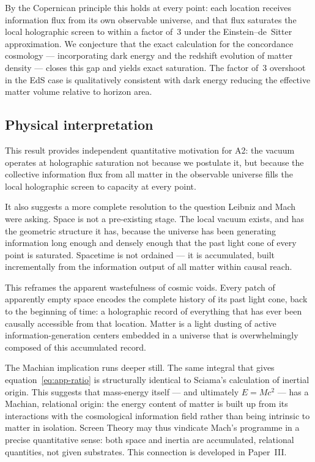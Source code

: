 \documentclass[12pt]{article}
\begin{document}
By the Copernican principle this holds at every point: each location
receives information flux from its own observable universe, and that
flux saturates the local holographic screen to within a factor of~3
under the Einstein--de~Sitter approximation.
We conjecture that the exact calculation for the concordance cosmology
--- incorporating dark energy and the redshift evolution of matter
density --- closes this gap and yields exact saturation.
The factor of~3 overshoot in the EdS case is qualitatively consistent
with dark energy reducing the effective matter volume relative to
horizon area.

\subsection*{Physical interpretation}

This result provides independent quantitative motivation for A2:
the vacuum operates at holographic saturation not because we
postulate it, but because the collective information flux from all
matter in the observable universe fills the local holographic screen
to capacity at every point.

It also suggests a more complete resolution to the question Leibniz
and Mach were asking.
Space is not a pre-existing stage.
The local vacuum exists, and has the geometric structure it has,
because the universe has been generating information long enough and
densely enough that the past light cone of every point is saturated.
Spacetime is not ordained --- it is accumulated, built incrementally
from the information output of all matter within causal reach.

This reframes the apparent wastefulness of cosmic voids.
Every patch of apparently empty space encodes the complete history
of its past light cone, back to the beginning of time: a holographic
record of everything that has ever been causally accessible from
that location.
Matter is a light dusting of active information-generation centers
embedded in a universe that is overwhelmingly composed of this
accumulated record.

The Machian implication runs deeper still.
The same integral that gives equation~\eqref{eq:app-ratio} is
structurally identical to Sciama's \cite{Sciama1953} calculation of
inertial origin.
This suggests that mass-energy itself --- and ultimately $E = Mc^2$
--- has a Machian, relational origin: the energy content of matter
is built up from its interactions with the cosmological information
field rather than being intrinsic to matter in isolation.
Screen Theory may thus vindicate Mach's programme in a precise
quantitative sense: both space and inertia are accumulated,
relational quantities, not given substrates.
This connection is developed in Paper~III.
\end{document}
